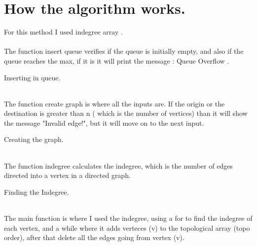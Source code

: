 \documentclass{report}
\begin{document}
\section*{How the algorithm works.}
For this method I used indegree array .
\\
\\The function insert queue verifies if the queue is initially empty, and also if the queue reaches the max, if it is it will print the message : Queue Overflow .
\\

\begin{algorithm}[H]
    {
    }
    \caption{Inserting in queue.}
\end{algorithm}

\\The function create graph is where all the inputs are. If the origin or the destination is greater than n ( which is the number of vertices) than it will show the message "Invalid edge!", but it will move on to the next input.
\\

\begin{algorithm}[H]
    \caption{Creating the graph.}
\end{algorithm}

\\The function indegree calculates the indegree, which is the number of edges directed into a vertex in a directed graph.
\\

\begin{algorithm}[H]
    \caption{Finding the Indegree.}
\end{algorithm}

\\The main function is where I used the indegree, using a for to find the indegree of each vertex, and a while where it adds verteces (v) to the topological array (topo order), after that  delete all the edges going from vertex (v).
\end{document}
